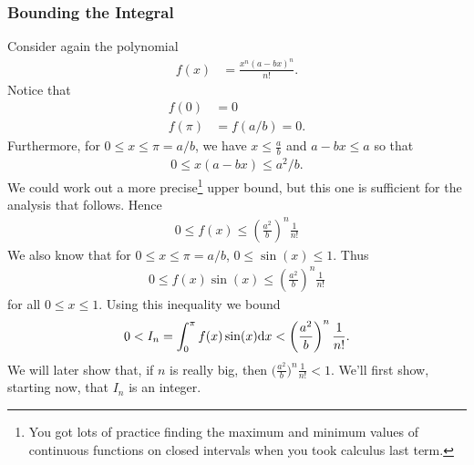 \subsubsection*{Bounding the Integral}
Consider again the polynomial
\begin{align*}
  f(x) &= \frac{x^n(a-bx)^n}{n!}.
\end{align*}
Notice that
\begin{align*}
f(0) &= 0 \\
f(\pi) &= f(a/b) = 0.
\end{align*}
Furthermore, for $0 \leq x \leq \pi=a/b$,
we have $x\le\frac{a}{b}$ and $a-bx\le a$ so that
\begin{align*}
  0 \leq x(a-bx) \leq a^2/b.
\end{align*}
We could work out a more precise\footnote{You got lots of practice
finding the maximum and minimum values of continuous functions on
closed intervals when you took calculus last term.} upper bound,
but this one is sufficient for the analysis that follows. Hence
\begin{align*}
  0 \leq f(x) \leq \left( \frac{a^2}{b} \right)^n \frac{1}{n!}
\end{align*}
We also know that for $0\leq x \leq \pi=a/b$, $0\leq \sin(x) \leq 1$. Thus
\begin{align*}
  0 \leq f(x)\sin(x) \leq \left( \frac{a^2}{b} \right)^n \frac{1}{n!}
\end{align*}
for all $0 \leq x \leq 1$. Using this inequality we bound
\begin{align*}
0 < I_n=\int_0^\pi f(x)\sin(x) \mathrm{d}x <
   \left( \frac{a^2}{b} \right)^n \frac{1}{n!}.
\end{align*}
We will later show that, if $n$ is really big, then
$\big( \frac{a^2}{b} \big)^n \frac{1}{n!}<1$. We'll first show,
starting now, that $I_n$ is an integer.


